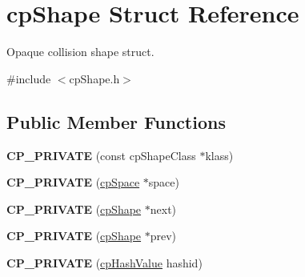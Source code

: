 \hypertarget{structcp_shape}{\section{cp\-Shape Struct Reference}
\label{structcp_shape}
}


Opaque collision shape struct.  




{\ttfamily \#include $<$cp\-Shape.\-h$>$}

\subsection*{Public Member Functions}
\begin{DoxyCompactItemize}
\item 
\hypertarget{structcp_shape_aaf3ec3dc8a5d3c6efc732d6f2ea27b71}{{\bfseries C\-P\-\_\-\-P\-R\-I\-V\-A\-T\-E} (const cp\-Shape\-Class $\ast$klass)}\label{structcp_shape_aaf3ec3dc8a5d3c6efc732d6f2ea27b71}

\item 
\hypertarget{structcp_shape_a33d2b7f8faa1a29e24fec0a371730c8d}{{\bfseries C\-P\-\_\-\-P\-R\-I\-V\-A\-T\-E} (\hyperlink{structcp_space}{cp\-Space} $\ast$space)}\label{structcp_shape_a33d2b7f8faa1a29e24fec0a371730c8d}

\item 
\hypertarget{structcp_shape_a053370dcca94d1e1b5386f55bb1cbc86}{{\bfseries C\-P\-\_\-\-P\-R\-I\-V\-A\-T\-E} (\hyperlink{structcp_shape}{cp\-Shape} $\ast$next)}\label{structcp_shape_a053370dcca94d1e1b5386f55bb1cbc86}

\item 
\hypertarget{structcp_shape_a4b7c01af5e905c492e67f33336213979}{{\bfseries C\-P\-\_\-\-P\-R\-I\-V\-A\-T\-E} (\hyperlink{structcp_shape}{cp\-Shape} $\ast$prev)}\label{structcp_shape_a4b7c01af5e905c492e67f33336213979}

\item 
\hypertarget{structcp_shape_a17e20412bc5a468a2ef4e8687c62950b}{{\bfseries C\-P\-\_\-\-P\-R\-I\-V\-A\-T\-E} (\hyperlink{group__basic_types_gae7eb4775a9f43914a15553ca65a048f4}{cp\-Hash\-Value} hashid)}\label{structcp_shape_a17e20412bc5a468a2ef4e8687c62950b}

\end{DoxyCompactItemize}
